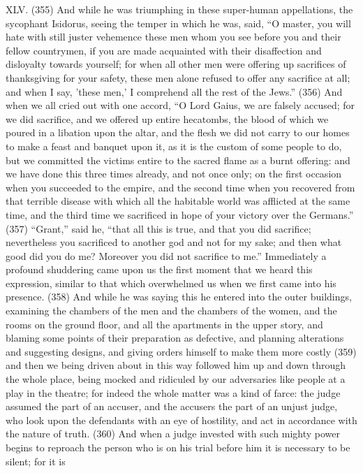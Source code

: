 XLV. (355) And while he was triumphing in these super-human appellations, the sycophant
Isidorus, seeing the temper in which he was, said, ``O master, you will hate with still juster
vehemence these men whom you see before you and their fellow countrymen, if you are made
acquainted with their disaffection and disloyalty towards yourself; for when all other men were
offering up sacrifices of thanksgiving for your safety, these men alone refused to offer any
sacrifice at all; and when I say, 'these men,' I comprehend all the rest of the Jews.'' (356) And when
we all cried out with one accord, ``O Lord Gaius, we are falsely accused; for we did sacrifice, and
we offered up entire hecatombs, the blood of which we poured in a libation upon the altar, and the
flesh we did not carry to our homes to make a feast and banquet upon it, as it is the custom of
some people to do, but we committed the victims entire to the sacred flame as a burnt offering: and
we have done this three times already, and not once only; on the first occasion when you
succeeded to the empire, and the second time when you recovered from that terrible disease with
which all the habitable world was afflicted at the same time, and the third time we sacrificed in hope
of your victory over the Germans.'' (357) ``Grant,'' said he, ``that all this is true, and that you did
sacrifice; nevertheless you sacrificed to another god and not for my sake; and then what good did
you do me? Moreover you did not sacrifice to me.'' Immediately a profound shuddering came upon
us the first moment that we heard this expression, similar to that which overwhelmed us when we
first came into his presence. (358) And while he was saying this he entered into the outer buildings,
examining the chambers of the men and the chambers of the women, and the rooms on the ground
floor, and all the apartments in the upper story, and blaming some points of their preparation as
defective, and planning alterations and suggesting designs, and giving orders himself to make them
more costly (359) and then we being driven about in this way followed him up and down through the
whole place, being mocked and ridiculed by our adversaries like people at a play in the theatre; for
indeed the whole matter was a kind of farce: the judge assumed the part of an accuser, and the
accusers the part of an unjust judge, who look upon the defendants with an eye of hostility, and act
in accordance with the nature of truth. (360) And when a judge invested with such mighty power
begins to reproach the person who is on his trial before him it is necessary to be silent; for it is
